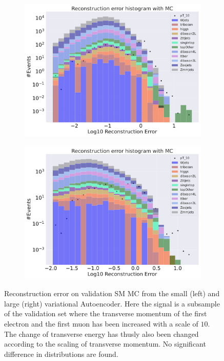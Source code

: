 \begin{figure}[H]
    \centering
    \begin{subfigure}{.45\textwidth}
        \includegraphics[width=\textwidth]{Figures/VAE_testing/small/b_data_recon_big_rm3_feats_sig_pT_10.pdf}
        \caption{ }
        \label{fig:VAE_small_pt_10}
    \end{subfigure}
    \hfill 
    \begin{subfigure}{.45\textwidth}
        \includegraphics[width=\textwidth]{Figures/VAE_testing/big/b_data_recon_big_rm3_feats_sig_pT_10.pdf}
        \caption{}
        \label{fig:VAE_big_pt_10}
    \end{subfigure}
    \hfill 
    \caption[VAE | Reconstruction error $p_T$ altering of 10]{Reconstruction error on validation SM MC from the small (left) and large (right) variational Autoencoder. Here the signal is a subsample of the validation 
    set where the transverse momentum of the first electron and the first muon has been increased with a scale of $10$. The change of transverse 
    energy has thusly also been changed according to the scaling of transverse momentum. No significant difference in distributions are found. }
    \label{fig:VAE_big_small_pt_10}
\end{figure}

